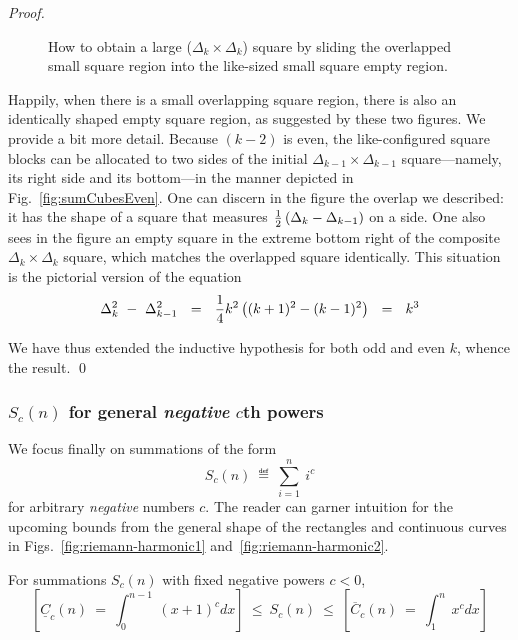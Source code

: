 \begin{proof}
\begin{figure}[hbt]
\begin{center}
\caption{How to obtain a large ($\Delta_k \times \Delta_k$) square by sliding the overlapped small square region into the like-sized small square empty region.}
       \label{fig:sumCubesEvenFinal}
\end{center}
\end{figure}
Happily, when there is a small overlapping square region, there is also an identically shaped empty square region, as suggested by these two figures.  We provide a bit more detail.  Because $(k-2)$ is even, the like-configured square blocks can be allocated to two sides of the initial $\Delta_{k-1} \times \Delta_{k-1}$ square---namely, its right side and its bottom---in the manner depicted in Fig.~\ref{fig:sumCubesEven}.  One can discern in the figure the overlap we described: it has the shape of a square that measures  ${1 \over 2} \left( \Delta_k - \Delta_{k-1}\right)$ on a side.  One also sees in the figure an empty square in the extreme bottom right of the composite $\Delta_k \times \Delta_k$ square, which matches the overlapped square identically.  This situation is the pictorial version of the equation
\[ \Delta_k^2 \ - \ \Delta_{k-1}^2 
 \ \ =  \ \ {1 \over 4} k^2 \left( (k+1)^2 - (k-1)^2 \right)  \ \ = \ \ k^3 \]

We have thus extended the inductive hypothesis for both odd and even $k$, whence the
result.  \qed
\end{proof}


\subsubsection{$S_c(n)$ for general {\em negative} $c$th powers}
\label{sec:sum-of-i2c<0}

We focus finally on summations of the form
\[ S_c(n) \ \eqdef \ \sum_{i=1}^n \ i^c \]
for arbitrary {\em negative} numbers $c$.  The reader can garner intuition for the upcoming bounds from the general shape of the rectangles and continuous curves in Figs.~\ref{fig:riemann-harmonic1} and~\ref{fig:riemann-harmonic2}.

\begin{prop}
\label{thm:general-bounds-negative-xc}
For summations $S_c(n)$ with fixed negative powers $c<0$,
\begin{equation} 
\label{eq:general-bounds-negative-xc}
\left[
\underline{C}_c(n) \ = \ \int_0^{n-1} \ (x+1)^c dx
\right]
\ \leq \ S_c(n) \ \leq \
\left[
\overline{C}_c(n) \ = \ \int_1^n \ x^c dx
\right]
\end{equation}
\end{prop}

